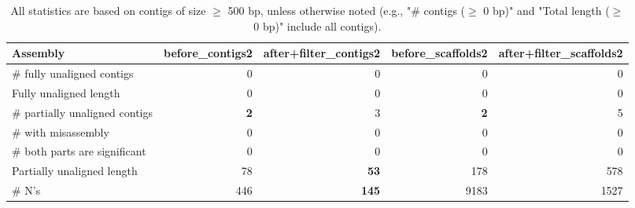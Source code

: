 \documentclass[12pt,a4paper]{article}
\begin{document}
\begin{table}[ht]
\begin{center}
\caption{All statistics are based on contigs of size $\geq$ 500 bp, unless otherwise noted (e.g., "\# contigs ($\geq$ 0 bp)" and "Total length ($\geq$ 0 bp)" include all contigs).}
\begin{tabular}{|l*{4}{|r}|}
\hline
Assembly & before\_contigs2 & after+filter\_contigs2 & before\_scaffolds2 & after+filter\_scaffolds2 \\ \hline
\# fully unaligned contigs & 0 & 0 & 0 & 0 \\ \hline
Fully unaligned length & 0 & 0 & 0 & 0 \\ \hline
\# partially unaligned contigs & {\bf 2} & 3 & {\bf 2} & 5 \\ \hline
\hspace{5mm}\# with misassembly & 0 & 0 & 0 & 0 \\ \hline
\hspace{5mm}\# both parts are significant & 0 & 0 & 0 & 0 \\ \hline
Partially unaligned length & 78 & {\bf 53} & 178 & 578 \\ \hline
\# N's & 446 & {\bf 145} & 9183 & 1527 \\ \hline
\end{tabular}
\end{center}
\end{table}
\end{document}
